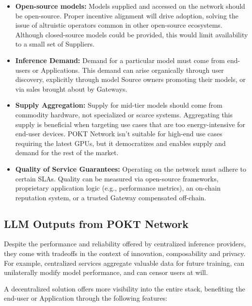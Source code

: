 \documentclass[conference,compsoc]{IEEEtran}
\begin{document}
\begin{itemize}
    \item \textbf{Open-source models:} Models supplied and accessed on the network should be open-source. Proper incentive alignment will drive adoption, solving the issue of altruistic operators common in other open-source ecosystems. Although closed-source models could be provided, this would limit availability to a small set of Suppliers.

    \item \textbf{Inference Demand:} Demand for a particular model must come from end-users or Applications. This demand can arise organically through user discovery, explicitly through model Source owners promoting their models, or via sales brought about by Gateways.

    \item \textbf{Supply Aggregation:} Supply for mid-tier models should come from commodity hardware, not specialized or scarce systems. Aggregating this supply is beneficial when targeting use cases that are too energy-intensive for end-user devices. POKT Network isn't suitable for high-end use cases requiring the latest GPUs, but it democratizes and enables supply and demand for the rest of the market.

    \item \textbf{Quality of Service Guarantees:} Operating on the network must adhere to certain SLAs. Quality can be measured via open-source frameworks, proprietary application logic (e.g., performance metrics), an on-chain reputation system, or a trusted Gateway compensated off-chain.

\end{itemize}

\subsection{LLM Outputs from POKT Network}

Despite the performance and reliability offered by centralized inference providers, they come with tradeoffs in the context of innovation, composability and privacy. For example, centralized services aggregate valuable data for future training, can unilaterally modify model performance, and can censor users at will.

A decentralized solution offers more visibility into the entire stack, benefiting the end-user or Application through the following features:
\end{document}
